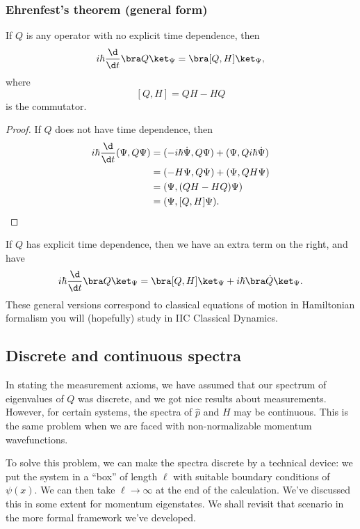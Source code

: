 \documentclass[a4paper]{article}
\begin{document}
\subsubsection*{Ehrenfest's theorem (general form)}
\begin{thm}
  If $Q$ is any operator with no explicit time dependence, then
  \[
    i\hbar \frac{\d}{\d t}\bra Q\ket_\Psi = \bra [Q, H]\ket_\Psi,
  \]
  where
  \[
    [Q, H] = QH - HQ
  \]
  is the commutator.
\end{thm}

\begin{proof}
  If $Q$ does not have time dependence, then
  \begin{align*}
    i\hbar \frac{\d}{\d t}(\Psi, Q\Psi) &= (-i\hbar \dot\Psi, Q\Psi) + (\Psi, Q i\hbar \dot\Psi)\\
    &= (-H\Psi, Q\Psi) + (\Psi, QH \Psi)\\
    &= (\Psi, (QH - HQ)\Psi)\\
    &= (\Psi, [Q, H] \Psi).
  \end{align*}
\end{proof}
If $Q$ has explicit time dependence, then we have an extra term on the right, and have
\[
  i\hbar \frac{\d}{\d t}\bra Q\ket_\Psi = \bra [Q, H]\ket_\Psi + i\hbar \bra \dot{Q} \ket_\Psi.
\]
These general versions correspond to classical equations of motion in Hamiltonian formalism you will (hopefully) study in IIC Classical Dynamics.

\subsection{Discrete and continuous spectra}
In stating the measurement axioms, we have assumed that our spectrum of eigenvalues of $Q$ was discrete, and we got nice results about measurements. However, for certain systems, the spectra of $\hat{p}$ and $H$ may be continuous. This is the same problem when we are faced with non-normalizable momentum wavefunctions.

To solve this problem, we can make the spectra discrete by a technical device: we put the system in a ``box'' of length $\ell$ with suitable boundary conditions of $\psi(x)$. We can then take $\ell \to \infty$ at the end of the calculation. We've discussed this in some extent for momentum eigenstates. We shall revisit that scenario in the more formal framework we've developed.
\end{document}
